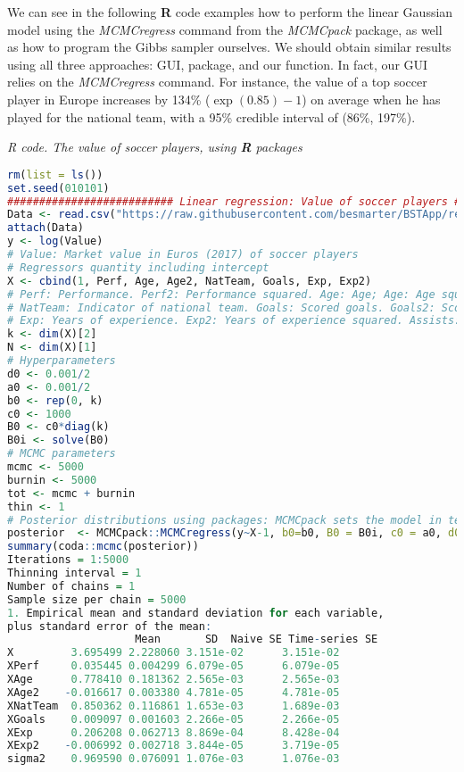 We can see in the following \textbf{R} code examples how to perform the linear Gaussian model using the \textit{MCMCregress} command from the \textit{MCMCpack} package, as well as how to program the Gibbs sampler ourselves. We should obtain similar results using all three approaches: GUI, package, and our function. In fact, our GUI relies on the \textit{MCMCregress} command. For instance, the value of a top soccer player in Europe increases by 134\% ($\exp(0.85)-1$) on average when he has played for the national team, with a 95\% credible interval of (86\%, 197\%).

\begin{tcolorbox}[enhanced,width=4.67in,center upper,
	fontupper=\large\bfseries,drop shadow southwest,sharp corners]\label{code1}
	\textit{R code. The value of soccer players, using \textbf{R} packages}
	\begin{VF}
		\begin{lstlisting}[language=R]		
rm(list = ls())
set.seed(010101)
########################## Linear regression: Value of soccer players ##########################
Data <- read.csv("https://raw.githubusercontent.com/besmarter/BSTApp/refs/heads/master/DataApp/1ValueFootballPlayers.csv", sep = ",", header = TRUE, quote = "")
attach(Data)
y <- log(Value) 
# Value: Market value in Euros (2017) of soccer players
# Regressors quantity including intercept
X <- cbind(1, Perf, Age, Age2, NatTeam, Goals, Exp, Exp2)
# Perf: Performance. Perf2: Performance squared. Age: Age; Age: Age squared. 
# NatTeam: Indicator of national team. Goals: Scored goals. Goals2: Scored goals squared
# Exp: Years of experience. Exp2: Years of experience squared. Assists: Number of assists
k <- dim(X)[2]
N <- dim(X)[1]
# Hyperparameters
d0 <- 0.001/2
a0 <- 0.001/2
b0 <- rep(0, k)
c0 <- 1000
B0 <- c0*diag(k)
B0i <- solve(B0)
# MCMC parameters
mcmc <- 5000
burnin <- 5000
tot <- mcmc + burnin
thin <- 1
# Posterior distributions using packages: MCMCpack sets the model in terms of the precision matrix
posterior  <- MCMCpack::MCMCregress(y~X-1, b0=b0, B0 = B0i, c0 = a0, d0 = d0, burnin = burnin, mcmc = mcmc, thin = thin)
summary(coda::mcmc(posterior))
Iterations = 1:5000
Thinning interval = 1 
Number of chains = 1 
Sample size per chain = 5000 
1. Empirical mean and standard deviation for each variable,
plus standard error of the mean:
					Mean       SD  Naive SE Time-series SE
X         3.695499 2.228060 3.151e-02      3.151e-02
XPerf     0.035445 0.004299 6.079e-05      6.079e-05
XAge      0.778410 0.181362 2.565e-03      2.565e-03
XAge2    -0.016617 0.003380 4.781e-05      4.781e-05
XNatTeam  0.850362 0.116861 1.653e-03      1.689e-03
XGoals    0.009097 0.001603 2.266e-05      2.266e-05
XExp      0.206208 0.062713 8.869e-04      8.428e-04
XExp2    -0.006992 0.002718 3.844e-05      3.719e-05
sigma2    0.969590 0.076091 1.076e-03      1.076e-03
\end{lstlisting}
	\end{VF}
\end{tcolorbox} 

